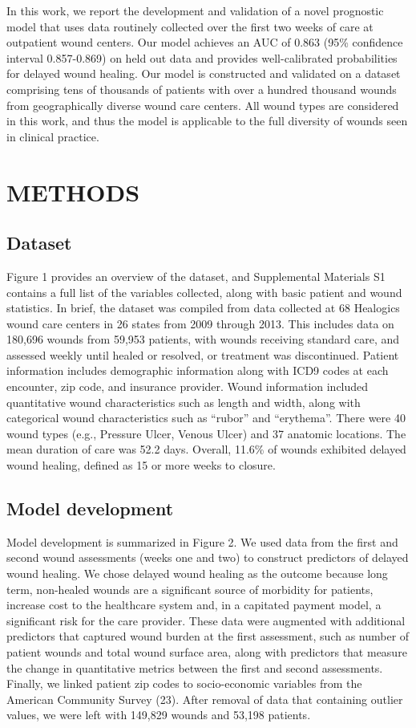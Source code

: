 In this work, we report the development and validation of a novel
prognostic model that uses data routinely collected over the first two
weeks of care at outpatient wound centers.  Our model achieves an AUC
of 0.863 (95\% confidence interval 0.857-0.869) on held out data and
provides well-calibrated probabilities for delayed wound healing.  Our
model is constructed and validated on a dataset comprising tens of
thousands of patients with over a hundred thousand wounds from
geographically diverse wound care centers.  All wound types are
considered in this work, and thus the model is applicable to the full
diversity of wounds seen in clinical practice.


\section{METHODS}

\subsection{Dataset}

Figure 1 provides an overview of the dataset, and Supplemental
Materials S1 contains a full list of the variables collected, along
with basic patient and wound statistics.  In brief, the dataset was
compiled from data collected at 68 Healogics wound care centers in 26
states from 2009 through 2013.  This includes data on 180,696 wounds
from 59,953 patients, with wounds receiving standard care, and
assessed weekly until healed or resolved, or treatment was
discontinued.  Patient information includes demographic information
along with ICD9 codes at each encounter, zip code, and insurance
provider.  Wound information included quantitative wound
characteristics such as length and width, along with categorical wound
characteristics such as “rubor” and “erythema”.  There were 40 wound
types (e.g., Pressure Ulcer, Venous Ulcer) and 37 anatomic locations.
The mean duration of care was 52.2 days.  Overall, 11.6\% of wounds
exhibited delayed wound healing, defined as 15 or more weeks to
closure.

\subsection{Model development}

Model development is summarized in Figure 2.  We used data from the
first and second wound assessments (weeks one and two) to construct
predictors of delayed wound healing.  We chose delayed wound healing
as the outcome because long term, non-healed wounds are a significant
source of morbidity for patients, increase cost to the healthcare
system and, in a capitated payment model, a significant risk for the
care provider. These data were augmented with additional predictors
that captured wound burden at the first assessment, such as number of
patient wounds and total wound surface area, along with predictors
that measure the change in quantitative metrics between the first and
second assessments.  Finally, we linked patient zip codes to
socio-economic variables from the American Community Survey (23).
After removal of data that containing outlier values, we were left
with 149,829 wounds and 53,198 patients.

